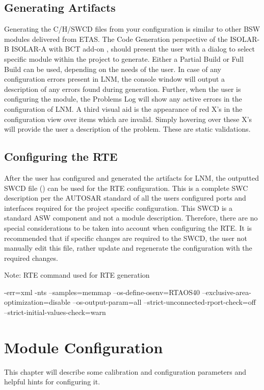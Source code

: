 \section{Generating Artifacts}
Generating the C/H/SWCD files from your configuration is similar to other BSW modules delivered from ETAS.
The Code Generation perspective of the 
\ifnum {}
{
ISOLAR-B
}
\else
{
ISOLAR-A with BCT add-on
}\fi , should present the user with a dialog to select specific module within the project to generate.
\ifnum {}
{
}
\else
{
Either a Partial Build or Full Build can be used, depending on the needs of the user.
}\fi 
In case of any configuration errors present in LNM, the console window will output a description of any errors found during generation.
Further, when the user is configuring the module, the Problems Log will show any active errors in the configuration of LNM.
A third visual aid is the appearance of red X’s in the configuration view over items which are invalid.
Simply hovering over these X’s will provide the user a description of the problem.
These are static validations.

\section{Configuring the RTE}
After the user has configured and generated the artifacts for LNM, the outputted SWCD file \linebreak() can be used for the RTE configuration. 
This is a complete SWC description per the AUTOSAR standard of all the users configured ports and interfaces required for the project specific configuration. 
This SWCD is a standard ASW component and not a module description. Therefore, there are no special considerations to be taken into account when configuring the RTE. 
It is recommended that if specific changes are required to the SWCD, the user not manually edit this file, rather update and regenerate the configuration with the required changes.


Note: RTE command used for RTE generation

\begin{rtecommandline}
-err=xml -nts --samples=memmap --os-define-osenv=RTAOS40 
--exclusive-area-optimization=disable --os-output-param=all 
--strict-unconnected-rport-check=off --strict-initial-values-check=warn
\end{rtecommandline}

\chapter{Module Configuration}
This chapter will describe some calibration and configuration parameters and helpful hints for configuring it.


